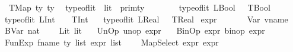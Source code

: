\begin{isabellebody}
\ \ \ \ TMap\ ty\ ty\ \isanewline
\isanewline
{}\isamarkupfalse%
\ type{\isacharunderscore}{\kern0pt}of{\isacharunderscore}{\kern0pt}lit\ {\isacharcolon}{\kern0pt}{\isacharcolon}{\kern0pt}\ {\isachardoublequoteopen}lit\ {\isasymRightarrow}\ prim{\isacharunderscore}{\kern0pt}ty{\isachardoublequoteclose}\isanewline
\ \ \ \isanewline
\ \ \ \ {\isachardoublequoteopen}type{\isacharunderscore}{\kern0pt}of{\isacharunderscore}{\kern0pt}lit\ {\isacharparenleft}{\kern0pt}LBool\ {\isacharunderscore}{\kern0pt}{\isacharparenright}{\kern0pt}\ {\isacharequal}{\kern0pt}\ TBool{\isachardoublequoteclose}\isanewline
\ \ {\isacharbar}{\kern0pt}\ {\isachardoublequoteopen}type{\isacharunderscore}{\kern0pt}of{\isacharunderscore}{\kern0pt}lit\ {\isacharparenleft}{\kern0pt}LInt\ {\isacharunderscore}{\kern0pt}{\isacharparenright}{\kern0pt}\ \ {\isacharequal}{\kern0pt}\ TInt{\isachardoublequoteclose}\isanewline
\ \ {\isacharbar}{\kern0pt}\ {\isachardoublequoteopen}type{\isacharunderscore}{\kern0pt}of{\isacharunderscore}{\kern0pt}lit\ {\isacharparenleft}{\kern0pt}LReal\ {\isacharunderscore}{\kern0pt}{\isacharparenright}{\kern0pt}\ {\isacharequal}{\kern0pt}\ TReal{\isachardoublequoteclose}\isanewline
\isanewline
{}\isamarkupfalse%
\ expr\isanewline
\ \ {\isacharequal}{\kern0pt}\isanewline
\ \ \ \ Var\ vname\isanewline
\ \ {\isacharbar}{\kern0pt}\ BVar\ nat\ \isanewline
\ \ {\isacharbar}{\kern0pt}\ Lit\ lit\isanewline
\ \ {\isacharbar}{\kern0pt}\ UnOp\ unop\ {\isachardoublequoteopen}expr{\isachardoublequoteclose}\isanewline
\ \ {\isacharbar}{\kern0pt}\ BinOp\ {\isachardoublequoteopen}{\isacharparenleft}{\kern0pt}expr{\isacharparenright}{\kern0pt}{\isachardoublequoteclose}\ binop\ {\isachardoublequoteopen}{\isacharparenleft}{\kern0pt}expr{\isacharparenright}{\kern0pt}{\isachardoublequoteclose}\ {\isacharparenleft}{\kern0pt}{\isachardoublequoteopen}{\isacharunderscore}{\kern0pt}\ {\isasymguillemotleft}{\isacharunderscore}{\kern0pt}{\isasymguillemotright}\ {\isacharunderscore}{\kern0pt}{\isachardoublequoteclose}\ {\isacharbrackleft}{\kern0pt}{}{}{\isacharcomma}{\kern0pt}{}{\isacharcomma}{\kern0pt}{}{}{\isacharbrackright}{\kern0pt}\ {}{}{\isacharparenright}{\kern0pt}\ \isanewline
\ \ {\isacharbar}{\kern0pt}\ FunExp\ fname\ {\isachardoublequoteopen}ty\ list{\isachardoublequoteclose}\ {\isachardoublequoteopen}{\isacharparenleft}{\kern0pt}expr\ list{\isacharparenright}{\kern0pt}{\isachardoublequoteclose}\ \isanewline
\ \ {\isacharbar}{\kern0pt}\ MapSelect\ expr\ expr\isanewline

\end{isabellebody}
